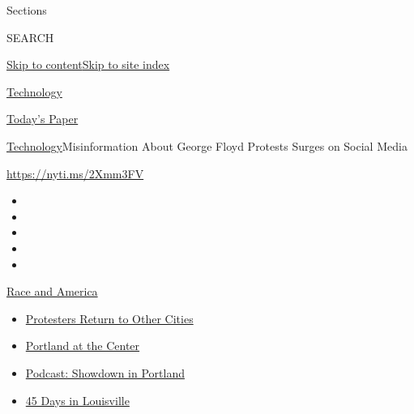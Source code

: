 Sections

SEARCH

\protect\hyperlink{site-content}{Skip to
content}\protect\hyperlink{site-index}{Skip to site index}

\href{https://www.nytimes3xbfgragh.onion/section/technology}{Technology}

\href{https://myaccount.nytimes3xbfgragh.onion/auth/login?response_type=cookie\&client_id=vi}{}

\href{https://www.nytimes3xbfgragh.onion/section/todayspaper}{Today's
Paper}

\href{/section/technology}{Technology}\textbar{}Misinformation About
George Floyd Protests Surges on Social Media

\url{https://nyti.ms/2Xmm3FV}

\begin{itemize}
\item
\item
\item
\item
\item
\end{itemize}

\href{https://www.nytimes3xbfgragh.onion/news-event/george-floyd-protests-minneapolis-new-york-los-angeles?action=click\&pgtype=Article\&state=default\&region=TOP_BANNER\&context=storylines_menu}{Race
and America}

\begin{itemize}
\tightlist
\item
  \href{https://www.nytimes3xbfgragh.onion/2020/07/26/us/protests-portland-seattle-trump.html?action=click\&pgtype=Article\&state=default\&region=TOP_BANNER\&context=storylines_menu}{Protesters
  Return to Other Cities}
\item
  \href{https://www.nytimes3xbfgragh.onion/2020/07/24/us/portland-oregon-protests-white-race.html?action=click\&pgtype=Article\&state=default\&region=TOP_BANNER\&context=storylines_menu}{Portland
  at the Center}
\item
  \href{https://www.nytimes3xbfgragh.onion/2020/07/23/podcasts/the-daily/portland-protests.html?action=click\&pgtype=Article\&state=default\&region=TOP_BANNER\&context=storylines_menu}{Podcast:
  Showdown in Portland}
\item
  \href{https://www.nytimes3xbfgragh.onion/interactive/2020/07/16/us/black-lives-matter-protests-louisville-breonna-taylor.html?action=click\&pgtype=Article\&state=default\&region=TOP_BANNER\&context=storylines_menu}{45
  Days in Louisville}
\end{itemize}

